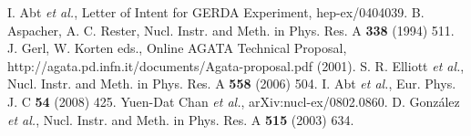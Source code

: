 \begin{thebibliography}{99}
 I. Abt \textit{et al.}, Letter of Intent for GERDA   Experiment, hep-ex/0404039.
 B. Aspacher, A. C.  Rester, Nucl. Instr. and Meth.   in Phys. Res. A \textbf{338} (1994) 511.
J. Gerl, W. Korten eds., Online AGATA Technical   Proposal, http://agata.pd.infn.it/documents/Agata-proposal.pdf   (2001).
 S. R. Elliott \textit{et al.}, Nucl. Instr. and   Meth. in Phys. Res. A \textbf{558} (2006) 504.
 I. Abt \textit{et al.}, Eur. Phys. J. C \textbf{54}   (2008) 425.
 Yuen-Dat Chan \textit{et al.}, arXiv:nucl-ex/0802.0860.
 D. Gonz\'alez \textit{et al.}, Nucl. Instr. and Meth.   in Phys. Res. A \textbf{515} (2003) 634.
\end{thebibliography}

